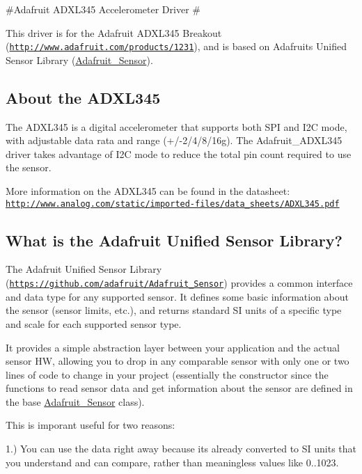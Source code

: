 \#\+Adafruit A\+D\+X\+L345 Accelerometer Driver \#

This driver is for the Adafruit A\+D\+X\+L345 Breakout (\href{http://www.adafruit.com/products/1231}{\tt http\+://www.\+adafruit.\+com/products/1231}), and is based on Adafruit\textquotesingle{}s Unified Sensor Library (\hyperlink{class_adafruit___sensor}{Adafruit\+\_\+\+Sensor}).

\subsection*{About the A\+D\+X\+L345}

The A\+D\+X\+L345 is a digital accelerometer that supports both S\+PI and I2C mode, with adjustable data rata and \textquotesingle{}range\textquotesingle{} (+/-\/2/4/8/16g). The Adafruit\+\_\+\+A\+D\+X\+L345 driver takes advantage of I2C mode to reduce the total pin count required to use the sensor.

More information on the A\+D\+X\+L345 can be found in the datasheet\+: \href{http://www.analog.com/static/imported-files/data_sheets/ADXL345.pdf}{\tt http\+://www.\+analog.\+com/static/imported-\/files/data\+\_\+sheets/\+A\+D\+X\+L345.\+pdf}

\subsection*{What is the Adafruit Unified Sensor Library?}

The Adafruit Unified Sensor Library (\href{https://github.com/adafruit/Adafruit_Sensor}{\tt https\+://github.\+com/adafruit/\+Adafruit\+\_\+\+Sensor}) provides a common interface and data type for any supported sensor. It defines some basic information about the sensor (sensor limits, etc.), and returns standard SI units of a specific type and scale for each supported sensor type.

It provides a simple abstraction layer between your application and the actual sensor HW, allowing you to drop in any comparable sensor with only one or two lines of code to change in your project (essentially the constructor since the functions to read sensor data and get information about the sensor are defined in the base \hyperlink{class_adafruit___sensor}{Adafruit\+\_\+\+Sensor} class).

This is imporant useful for two reasons\+:

1.) You can use the data right away because it\textquotesingle{}s already converted to SI units that you understand and can compare, rather than meaningless values like 0..1023.

